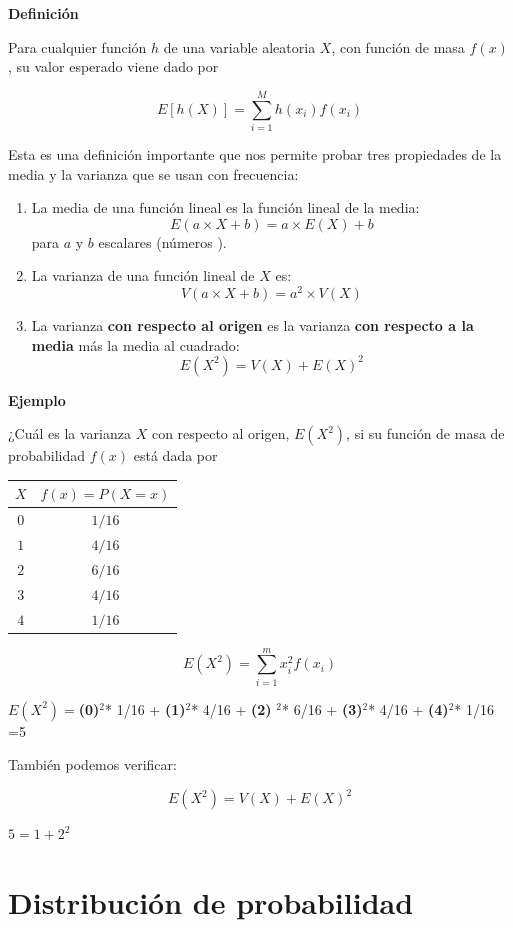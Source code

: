 \documentclass[
]{book}
\begin{document}
\textbf{Definición}

Para cualquier función \(h\) de una variable aleatoria \(X\), con función de masa \(f(x)\), su valor esperado viene dado por

\[ E[h(X)]= \sum_{i=1}^M h(x_i) f(x_i) \]

Esta es una definición importante que nos permite probar tres propiedades de la media y la varianza que se usan con frecuencia:

\begin{enumerate}
\def\labelenumi{\arabic{enumi})}
\item
  La media de una función lineal es la función lineal de la media: \[E(a\times X +b)= a\times E(X) +b\] para \(a\) y \(b\) escalares (números ).
\item
  La varianza de una función lineal de \(X\) es:\[V(a\times X +b)= a^2\times V(X)\]
\item
  La varianza \textbf{con respecto al origen} es la varianza \textbf{con respecto a la media} más la media al cuadrado: \[E(X^2)=V(X)+E(X)^2\]
\end{enumerate}

\textbf{Ejemplo}

¿Cuál es la varianza \(X\) con respecto al origen, \(E(X^2)\), si su función de masa de probabilidad \(f(x)\) está dada por

\begin{longtable}[]{@{}cc@{}}
\toprule\noalign{}
\(X\) & \(f(x)=P(X=x)\) \\
\midrule\noalign{}
\endhead
\bottomrule\noalign{}
\endlastfoot
\(0\) & \(1/16\) \\
\(1\) & \(4/16\) \\
\(2\) & \(6/16\) \\
\(3\) & \(4/16\) \\
\(4\) & \(1/16\) \\
\end{longtable}

\[E(X^2) =\sum_{i=1}^m x_i^2 f(x_i)\]

\(E(X^2)=\)\textbf{(0)}\(^2\)* 1/16 + \textbf{(1)}\(^2\)* 4/16 + \textbf{(2)} \(^2\)* 6/16 + \textbf{(3)}\(^2\)* 4/16 + \textbf{(4)}\(^2\)* 1/16 =5

También podemos verificar:

\[E(X^2)=V(X)+E(X)^2\]

\(5=1+2^2\)

\hypertarget{distribuciuxf3n-de-probabilidad}{%
\section{Distribución de probabilidad}\label{distribuciuxf3n-de-probabilidad}}
\end{document}
